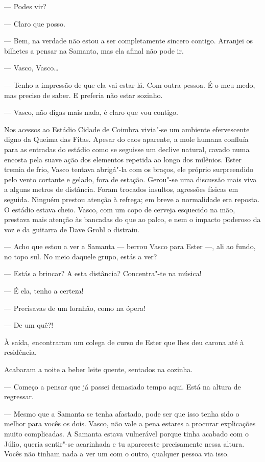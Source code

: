 --- Podes vir?

--- Claro que posso.

--- Bem, na verdade não estou a ser completamente sincero contigo.
  Arranjei os bilhetes a pensar na Samanta, mas ela afinal não pode ir.

--- Vasco, Vasco\ldots{}

--- Tenho a impressão de que ela vai estar lá. Com outra pessoa. É o meu
  medo, mas preciso de saber. E preferia não estar sozinho.

--- Vasco, não digas mais nada, é claro que vou contigo.

Nos acessos ao
  Estádio Cidade de Coimbra vivia"-se um ambiente efervescente digno da Queima das Fitas. Apesar do caos
aparente, a mole humana confluía para as entradas do estádio como se
seguisse um declive natural, cavado numa encosta pela suave ação dos
elementos repetida ao longo dos milênios. Ester tremia de frio, Vasco
tentava abrigá"-la com os braços, ele próprio surpreendido pelo vento
cortante e gelado, fora de estação. Gerou"-se uma discussão mais viva a
alguns metros de distância. Foram trocados insultos, agressões físicas
em seguida. Ninguém prestou atenção à refrega; em breve a normalidade
era reposta. O estádio estava cheio. Vasco, com um copo de cerveja
esquecido na mão, prestava mais atenção às bancadas do que ao palco, e
nem o impacto poderoso da voz e da guitarra de Dave Grohl o distraiu.

--- Acho que estou a ver a Samanta --- berrou Vasco para Ester ---, ali ao
  fundo, no topo sul. No meio daquele grupo, estás a ver?

--- Estás a brincar? A esta distância? Concentra"-te na música!

--- É ela, tenho a certeza!

--- Precisavas de um lornhão, como na ópera!

--- De um quê?!


À saída, encontraram um colega de curso de Ester que lhes deu carona até
à residência.

Acabaram a noite a beber leite quente, sentados na cozinha.

--- Começo a pensar que já passei demasiado tempo aqui.
Está na altura de regressar.

--- Mesmo que a Samanta se tenha afastado, pode ser que isso tenha sido o
  melhor para vocês os dois. Vasco, não vale a pena estares a procurar
  explicações muito complicadas. A Samanta estava vulnerável porque
  tinha acabado com o Júlio, queria sentir"-se acarinhada e tu apareceste
  precisamente nessa
altura. Vocês não tinham nada a ver um com o outro, qualquer pessoa via
isso.

